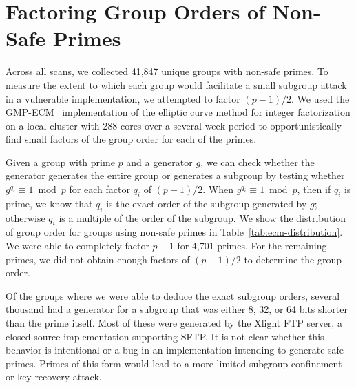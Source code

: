 
\section{Factoring Group Orders of Non-Safe Primes}
\label{sec:ecm}

Across all scans, we collected 41,847 unique groups with non-safe primes.
To measure the extent to which each group would facilitate a small subgroup
attack in a vulnerable implementation, we attempted to factor $(p-1)/2$. We
used the GMP-ECM~\cite{gmp-ecm-zimmerman-2012} implementation of the elliptic curve method for
integer factorization on a local cluster with 288 cores over a several-week
period to opportunistically find small factors of the group order for each of
the primes.

\ECMBreakableGroups

\ECMRFCFiveFiveOneFourGroups

Given a group with prime $p$ and a generator $g$, we can check whether the
generator generates the entire group or generates a subgroup by testing whether
$g^{q_i} \equiv 1 \bmod p$ for each factor $q_i$ of $(p-1)/2$.  When $g^{q_i}
\equiv 1 \bmod p$, then if $q_i$ is prime, we know that $q_i$ is the exact
order of the subgroup generated by $g$; otherwise $q_i$ is a multiple of the
order of the subgroup. We show the distribution of group order for groups using
non-safe primes in Table~\ref{tab:ecm-distribution}.  We were able to
completely factor $p-1$ for 4,701 primes.  For the remaining primes, we
did not obtain enough factors of $(p-1)/2$ to determine the group order. 


Of the groups where we were able to deduce the exact subgroup orders, several
thousand had a generator for a subgroup that was either 8, 32, or 64 bits
shorter than the prime itself.  Most of these were generated by the Xlight FTP
server, a closed-source implementation supporting SFTP.  It is not clear
whether this behavior is intentional or a bug in an implementation intending to
generate safe primes.  Primes of this form would lead to a more limited
subgroup confinement or key recovery attack.

